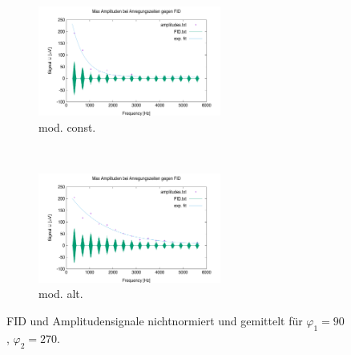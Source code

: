 \documentclass[../../main.tex]{subfiles}
\begin{document}
        \begin{figure}[H]
            \centering
            \begin{subfigure}[b]{0.4\textwidth}
                \centering
                \includegraphics[width=6cm]{Bilddateien/10/CPMG-90-270-constant-avg.png}
                \caption{mod. const.}
                \label{fig:CPMG-90-270-constant-avg}
            \end{subfigure}
            \
            \begin{subfigure}[b]{0.4\textwidth}
                \centering
                \includegraphics[width=6cm]{Bilddateien/10/CPMG-90-270-alternating-avg.png}
                \caption{mod. alt.}
                \label{fig:CPMG-90-270-alternating-avg}
            \end{subfigure}
            \caption{FID und Amplitudensignale nichtnormiert und gemittelt für $\varphi_1 = 90$, $\varphi_2 = 270$.}
            \label{fig:CPMG-90-270-avg}
        \end{figure}
        

\end{document}
